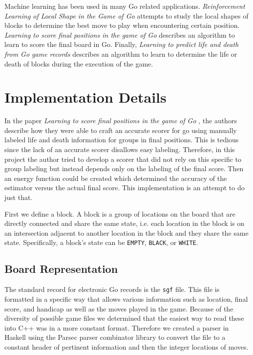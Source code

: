 \documentclass[11pt,letterpaper]{article}
\begin{document}
Machine learning has been used in many Go related applications.
\emph{Reinforcement Learning of Local Shape in the Game of Go} \cite{SSM:07}  attempts to study the local shapes
of blocks to determine the best move to play when encountering certain position.
\emph{Learning to score final positions in the game of Go} \cite{WHU:04} describes an algorithm to learn to score
the final board in Go. Finally, \emph{Learning to predict life and death from Go game records} \cite{WWHU:05}
describes an algorithm to learn to determine the life or death of blocks during the execution of the game.

\section{Implementation Details}

In the paper \emph{Learning to score final positions in the game of Go} \cite{WHU:04}, the authors describe how they
were able to craft an accurate scorer for go using manually labeled life and death information for groups in final
positions. This is tedious since the lack of an accurate scorer disallows easy labeling. Therefore, in this project the
author tried to develop a scorer that did not rely on this specific to group labeling but instead depends only on the
labeling of the final score. Then an energy function could be created which determined the accuracy of the estimator
versus the actual final score. This implementation is an attempt to do just that.

First we define a block. A block is a group of locations on the board that are directly connected and share the same
state, i.e. each location in the block is on an intersection adjacent to another location in the block and they share the
same state. Specifically, a block's state can be {\tt EMPTY}, {\tt BLACK}, or {\tt WHITE}.

\subsection{Board Representation}

The standard record for electronic Go records is the {\tt sgf} file. This file is formatted in a specific way that allows
various information such as location, final score, and handicap as well as the moves played in the game. Because
of the diversity of possible game files we determined that the easiest way to read these into C++ was in a more
constant format. Therefore we created a parser in Haskell using the Parsec parser combinator library to convert the
file to a constant header of pertinent information and then the integer locations of moves.
\end{document}
